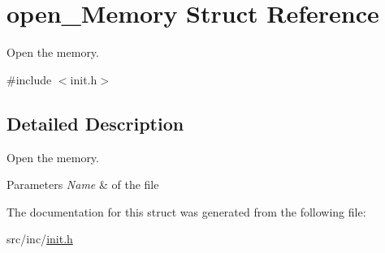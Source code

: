 \hypertarget{structopen___memory}{}\section{open\+\_\+\+Memory Struct Reference}
\label{structopen___memory}


Open the memory.  




{\ttfamily \#include $<$init.\+h$>$}



\subsection{Detailed Description}
Open the memory. 


\begin{DoxyParams}{Parameters}
{\em Name} & of the file \\
\hline
\end{DoxyParams}


The documentation for this struct was generated from the following file\+:\begin{DoxyCompactItemize}
\item 
src/inc/\mbox{\hyperlink{init_8h}{init.\+h}}\end{DoxyCompactItemize}

